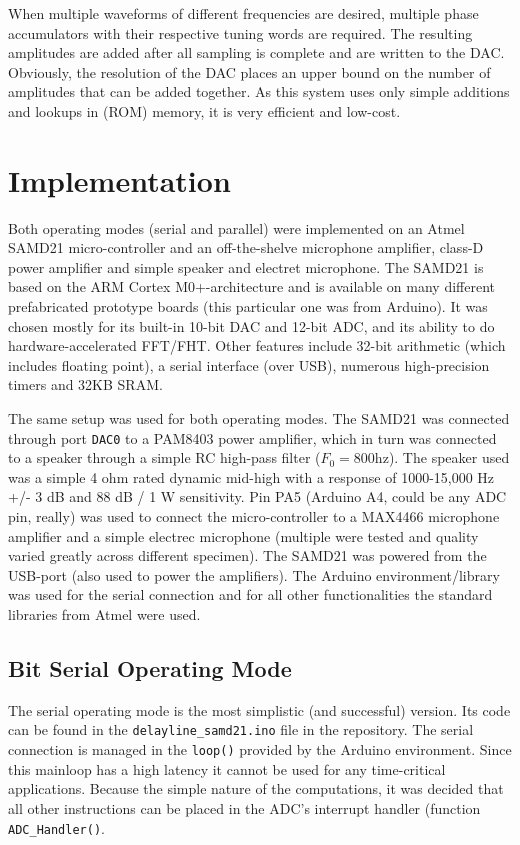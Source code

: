 \documentclass[10pt,a4paper,twocolumn]{article}
\begin{document}
When multiple waveforms of different frequencies are desired, multiple phase accumulators with their respective tuning words are required. The resulting amplitudes are added after all sampling is complete and are written to the DAC. Obviously, the resolution of the DAC places an upper bound on the number of amplitudes that can be added together. As this system uses only simple additions and lookups in (ROM) memory, it is very efficient and low-cost. 

\section{Implementation}
Both operating modes (serial and parallel) were implemented on an Atmel SAMD21 micro-controller\cite{samd21} and an off-the-shelve microphone amplifier, class-D power amplifier and simple speaker and electret microphone. The SAMD21 is based on the ARM Cortex M0+-architecture and is available on many different prefabricated prototype boards (this particular one was from Arduino). It was chosen mostly for its built-in 10-bit DAC and 12-bit ADC, and its ability to do hardware-accelerated FFT/FHT. Other features include 32-bit arithmetic (which includes floating point), a serial interface (over USB), numerous high-precision timers and 32KB SRAM.

The same setup was used for both operating modes. The SAMD21 was connected through port \texttt{DAC0} to a PAM8403 power amplifier, which in turn was connected to a speaker through a simple RC high-pass filter ($F_0 = 800\mathrm{hz}$). The speaker used was a simple 4 ohm rated dynamic mid-high with a response of 1000-15,000 Hz +/- 3 dB and 88 dB / 1 W sensitivity. Pin PA5 (Arduino A4, could be any ADC pin, really) was used to connect the micro-controller to a MAX4466 microphone amplifier and a simple electrec microphone (multiple were tested and quality varied greatly across different specimen). The SAMD21 was powered from the USB-port (also used to power the amplifiers). The Arduino environment/library was used for the serial connection and for all other functionalities the standard libraries from Atmel were used.

\subsection{Bit Serial Operating Mode}
The serial operating mode is the most simplistic (and successful) version. Its code can be found in the \texttt{delayline\_samd21.ino} file in the repository\cite{repo}. The serial connection is managed in the \texttt{loop()} provided by the Arduino environment. Since this mainloop has a high latency it cannot be used for any time-critical applications. Because the simple nature of the computations, it was decided that all other instructions can be placed in the ADC's interrupt handler (function \texttt{ADC\_Handler()}.
\end{document}
